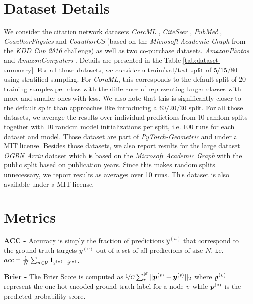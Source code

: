 \section{Dataset Details} \label{sec:app_dataset_details}
We consider the citation network datasets \emph{CoraML} \citep{Mccallum2000, Giles1998, Getoor2005, Sen2008a, Bojchevski2017}, \emph{CiteSeer} \citep{Giles1998, Getoor2005, Sen2008a}, \emph{PubMed} \citep{Namata2012}, \emph{CoauthorPhysics} and \emph{CoauthorCS} (based on the \emph{Microsoft Academic Graph} from the \emph{KDD Cup 2016} challenge) \citep{Shchur2018}
as well as two co-purchase datasets, \emph{AmazonPhotos} and \emph{AmazonComputers} \citep{Mcauley2015, Shchur2018}. Details are presented in the Table \ref{tab:dataset-summary}. For all those datasets, we consider a train/val/test split of $5/15/80$ using stratified sampling. For \emph{CoraML}, this corresponds to the default split of $20$ training samples per class with the difference of representing larger classes with more and smaller ones with less. We also note that this is significantly closer to the default split than approaches like \citep{Wang2020, Huang2020} introducing a $60/20/20$ split. For all those datasets, we average the results over individual predictions from 10 random splits together with 10 random model initializations per split, i.e. 100 runs for each dataset and model. Those dataset are part of \emph{PyTorch-Geometric} and under a MIT license. Besides those datasets, we also report results for the large dataset \emph{OGBN Arxiv} dataset \citep{ogb-dataset} which is based on the \emph{Microsoft Academic Graph} \citep{microsoft-academic-graph} with the public split based on publication years. Since this makes random splits unnecessary, we report results as averages over 10 runs. This dataset is also available under a MIT license.



\section{Metrics} \label{sec:app_metrics}
\textbf{ACC - } Accuracy is simply the fraction of predictions $\hat{y}^{(u)}$ that correspond to the ground-truth targets $y^{(u)}$ out of a set of all predictions of size $N$, i.e. $acc = \frac{1}{N}\sum_{u\in \mathcal{V}} 1_{y^{(u)} = \hat{y}^{(u)}}$.

\textbf{Brier - } The Brier Score is computed as $\nicefrac{1}{C}\sum_v^N ||\bm{p}^{(v)} - \bm{y}^{(v)}||_2$ where $\bm{y}^{(v)}$ represent the one-hot encoded ground-truth label for a node $v$ while $\bm{p}^{(v)}$ is the predicted probability score. 

